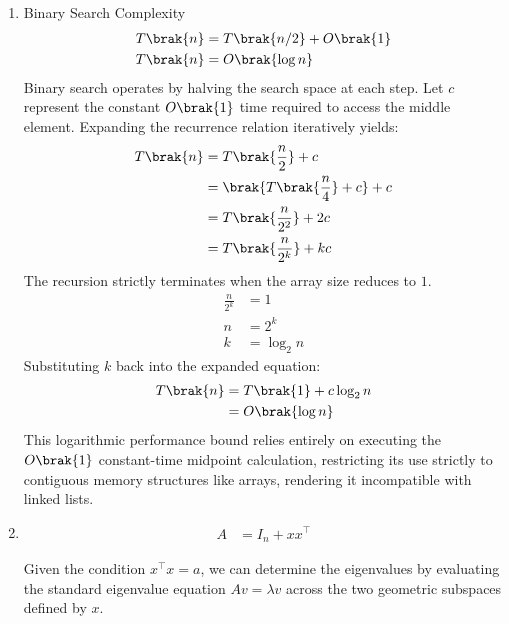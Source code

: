 \begin{enumerate}[label=\thesubsection.\arabic*, ref=\thesubsection.\theenumi]
	\item Binary Search Complexity
	\begin{align}
		T\brak{n} &= T\brak{n/2} + O\brak{1} \label{eq:DA2025-binary_recurrence}
		\\
		T\brak{n} &= O\brak{\log n} \label{eq:DA2025-binary_search}
	\end{align}
	\solution
	Binary search operates by halving the search space at each step. Let $c$ represent the constant $O\brak{1}$ time required to access the middle element. Expanding the recurrence relation iteratively yields:
	\begin{align}
		T\brak{n} &= T\brak{\frac{n}{2}} + c
		\\
		&= \brak{T\brak{\frac{n}{4}} + c} + c
		\\
		&= T\brak{\frac{n}{2^2}} + 2c
		\\
		&= T\brak{\frac{n}{2^k}} + kc
	\end{align}
	The recursion strictly terminates when the array size reduces to $1$. 
	\begin{align}
		\frac{n}{2^k} &= 1
		\\
		n &= 2^k
		\\
		k &= \log_2 n
	\end{align}
	Substituting $k$ back into the expanded equation:
	\begin{align}
		T\brak{n} &= T\brak{1} + c \log_2 n
		\\
		&= O\brak{\log n}
	\end{align}
	This logarithmic performance bound relies entirely on executing the $O\brak{1}$ constant-time midpoint calculation, restricting its use strictly to contiguous memory structures like arrays, rendering it incompatible with linked lists.
	
	\item 
	\begin{align}
		A &= I_n + x x^\top \label{eq:DA2025-rank1_update}
	\end{align}
	
	Given the condition $x^\top x = a$, we can determine the eigenvalues by evaluating the standard eigenvalue equation $A v = \lambda v$ across the two geometric subspaces defined by $x$.
	

\end{enumerate}

